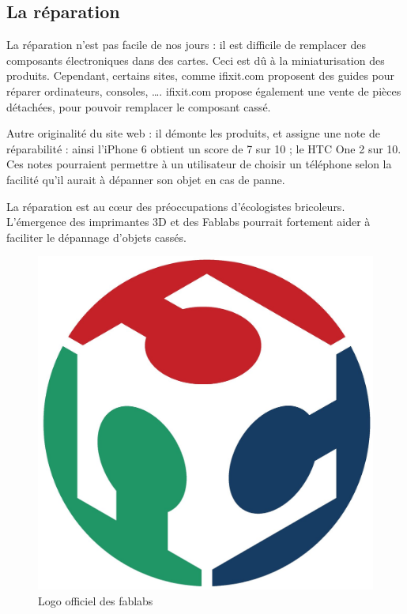 \subsection{La réparation}
\label{ss::repartation}


La réparation n'est pas facile de nos jours : il est difficile de remplacer des composants électroniques dans des cartes. Ceci est dû à la miniaturisation des produits. Cependant, certains sites, comme ifixit.com proposent des guides pour réparer ordinateurs, consoles, \dots. ifixit.com propose également une vente de pièces détachées, pour pouvoir remplacer le composant cassé. 

Autre originalité du site web : il démonte les produits, et assigne une note de réparabilité : ainsi l'iPhone 6 obtient un score de 7 sur 10 ; le HTC One 2 sur 10.  Ces notes pourraient permettre à un utilisateur de choisir un téléphone selon la facilité qu'il aurait à dépanner son objet en cas de panne. 
\medbreak

La réparation est au cœur des préoccupations d'écologistes bricoleurs. L'émergence des imprimantes 3D et des Fablabs pourrait fortement aider  à faciliter le dépannage d'objets cassés. 

\begin{figure}\begin{center}
\vspace{-0.7cm}\includegraphics[scale=0.20]{Rsc/logofablab.jpg} 

\caption{Logo officiel des fablabs}
\end{center}
\end{figure}

